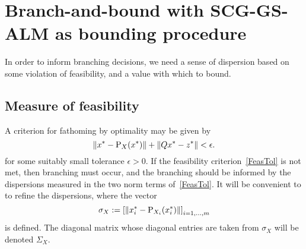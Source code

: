 \section{Branch-and-bound with SCG-GS-ALM as bounding procedure}

In order to inform branching decisions, we need a sense of dispersion based on some violation of feasibility, and a value with which to bound.

\subsection{Measure of feasibility}

A criterion for fathoming by optimality may be given by
\begin{equation}\label{FeasTol}
\left \| x^* - \text{P}_X(x^*) \right \| + \left \| Qx^*-z^* \right \| < \epsilon.
\end{equation}
for some suitably small tolerance $\epsilon > 0$. If the feasibility criterion~\eqref{FeasTol} is not met, then branching must occur, and the branching should be informed by the dispersions measured in the two norm terms of~\eqref{FeasTol}. It will be convenient to to refine the dispersions, where the vector
$$
\sigma_X :=\left[\left \| x_i^* - \text{P}_{X_i}(x_i^*) \right \| \right]_{i=1,\dots,m}
$$
is defined. The diagonal matrix whose diagonal entries are taken from $\sigma_X$ will be denoted $\Sigma_X$.

